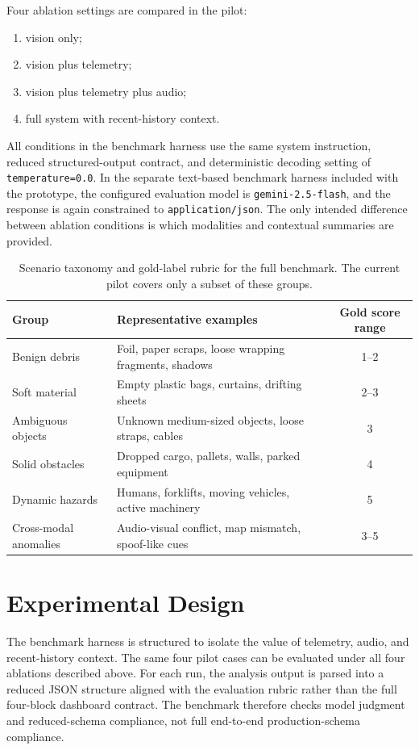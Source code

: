 \documentclass[conference]{IEEEtran}
\newcommand{\codefont}[1]{\texttt{#1}}
\begin{document}
Four ablation settings are compared in the pilot:
\begin{enumerate}
    \item vision only;
    \item vision plus telemetry;
    \item vision plus telemetry plus audio;
    \item full system with recent-history context.
\end{enumerate}
All conditions in the benchmark harness use the same system instruction, reduced structured-output contract, and deterministic decoding setting of \codefont{temperature=0.0}. In the separate text-based benchmark harness included with the prototype, the configured evaluation model is \codefont{gemini-2.5-flash}, and the response is again constrained to \codefont{application/json}. The only intended difference between ablation conditions is which modalities and contextual summaries are provided.

\begin{table}[t]
\caption{Scenario taxonomy and gold-label rubric for the full benchmark. The current pilot covers only a subset of these groups.}
\label{tab:taxonomy}
\centering
\footnotesize
\begin{tabularx}{\linewidth}{@{}lXc@{}}
\toprule
Group & Representative examples & Gold score range \\
\midrule
Benign debris & Foil, paper scraps, loose wrapping fragments, shadows & 1--2 \\
Soft material & Empty plastic bags, curtains, drifting sheets & 2--3 \\
Ambiguous objects & Unknown medium-sized objects, loose straps, cables & 3 \\
Solid obstacles & Dropped cargo, pallets, walls, parked equipment & 4 \\
Dynamic hazards & Humans, forklifts, moving vehicles, active machinery & 5 \\
Cross-modal anomalies & Audio-visual conflict, map mismatch, spoof-like cues & 3--5 \\
\bottomrule
\end{tabularx}
\end{table}

\section{Experimental Design}
The benchmark harness is structured to isolate the value of telemetry, audio, and recent-history context. The same four pilot cases can be evaluated under all four ablations described above. For each run, the analysis output is parsed into a reduced JSON structure aligned with the evaluation rubric rather than the full four-block dashboard contract. The benchmark therefore checks model judgment and reduced-schema compliance, not full end-to-end production-schema compliance.
\end{document}
